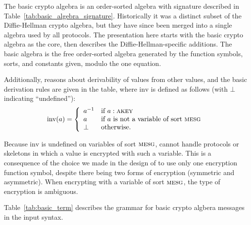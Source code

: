 The basic crypto algebra is an order-sorted algebra with signature
described in Table~\ref{tab:basic_algebra_signature}.  Historically it
was a distinct subset of the Diffie-Hellman crypto algebra, but they
have since been merged into a single algebra used by all
protocols. The presentation here starts with the basic crypto algebra
as the core, then describes the Diffie-Hellman-specific additions. The
basic algebra is the free order-sorted algebra generated by the function
symbols, sorts, and constants given, modulo the one equation.

Additionally, {\cpsa} reasons about derivability of values from other
values, and the basic derivation rules are given in the table, where
$\mathrm{inv}$ is defined as follows (with $\bot$ indicating
``undefined''):
\begin{equation}
%
\mathrm{inv}(a) = \left\{
%
\begin{array}{ll}
%
a^{-1} & \mbox{if $a : \scap{akey}$}\\
%
a & \mbox{if $a$ is not a variable of sort $\scap{mesg}$} \\
%
\bot & \mbox{otherwise}.
%
\end{array}
%
\right.  %
\end{equation}

Because $\mathrm{inv}$ is undefined on variables of sort
$\scap{mesg}$, {\cpsa} cannot handle protocols or skeletons in which a
value is encrypted with such a variable.  This is a consequence of the
choice we made in the design of {\cpsa} to use only one encryption
function symbol, despite there being two forms of encryption
(symmetric and asymmetric).  When encrypting with a variable of sort
$\scap{mesg}$, the type of encryption is ambiguous.

Table~\ref{tab:basic_term} describes the grammar for basic crypto
algbera messages in the input syntax.

\begin{table}
\caption{{\cpsa} Basic Algebra Syntax; {sorts}, operators \textsc{id}
  from \textsc{Lang} field}\label{tab:basic_term}
\end{table}

